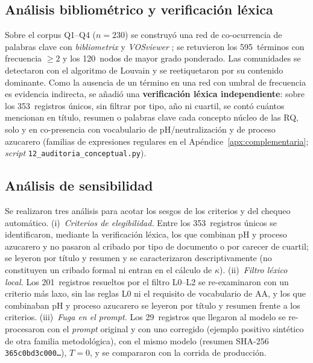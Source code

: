\subsection{Análisis bibliométrico y verificación léxica}
\label{sub:bibliometria}

Sobre el corpus Q1--Q4 ($n=230$) se construyó una red de co-ocurrencia de
palabras clave con \textit{bibliometrix} \parencite{ARIA2017959} y
\textit{VOSviewer} \parencite{vanecksoftware2010}; se retuvieron los
595~términos con frecuencia $\geq 2$ y los 120~nodos de mayor grado
ponderado. Las comunidades se detectaron con el algoritmo de Louvain
\parencite{blondel2008fast} y se reetiquetaron por su contenido
dominante. Como la ausencia de un término en una red con umbral de
frecuencia es evidencia indirecta, se añadió una \textbf{verificación
léxica independiente}: sobre los 353~registros únicos, sin filtrar por
tipo, año ni cuartil, se contó cuántos mencionan en título, resumen o
palabras clave cada concepto núcleo de las RQ, solo y en co-presencia con
vocabulario de pH/neutralización y de proceso azucarero (familias
de expresiones regulares en el Apéndice~\ref{apx:complementaria};
\textit{script} \texttt{12\_auditoria\_conceptual.py}).

\subsection{Análisis de sensibilidad}
\label{sub:sensibilidad}

Se realizaron tres análisis para acotar los sesgos de los criterios y del
chequeo automático.
(i)~\emph{Criterios de elegibilidad.} Entre los 353~registros únicos se
identificaron, mediante la verificación léxica, los que combinan pH y
proceso azucarero y no pasaron al cribado por tipo de documento o por
carecer de cuartil; se leyeron por título y resumen y se caracterizaron
descriptivamente (no constituyen un cribado formal ni entran en el
cálculo de $\kappa$).
(ii)~\emph{Filtro léxico local.} Los 201~registros resueltos por el
filtro L0--L2 se re-examinaron con un criterio más laxo, sin las reglas L0
ni el requisito de vocabulario de AA, y los que combinaban pH y proceso
azucarero se leyeron por título y resumen frente a los criterios.
(iii)~\emph{Fuga en el \textit{prompt}.} Los 29~registros que llegaron al
modelo se re-procesaron con el \textit{prompt} original y con uno
corregido (ejemplo positivo sintético de otra familia metodológica), con
el mismo modelo (resumen SHA-256
\texttt{365c0bd3c000\ldots}), $T=0$, y se compararon con la corrida de
producción.

